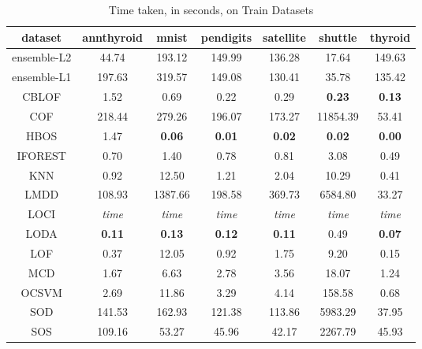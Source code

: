 \begin{table*}[!t]
\renewcommand{\arraystretch}{1.25}
\caption{Time taken, in seconds, on Train Datasets}
\label{table:results:train-time}
\centering
\begin{tabular}{|c|c|c|c|c|c|c|}
    \hline
    \textbf{dataset} & \textbf{annthyroid} & \textbf{mnist} & \textbf{pendigits} & \textbf{satellite} & \textbf{shuttle} & \textbf{thyroid} \\
    \hline
    ensemble-L2 & 44.74 & 193.12 & 149.99 & 136.28 & 17.64 & 149.63 \\
    \hline
    ensemble-L1 & 197.63 & 319.57 & 149.08 & 130.41 & 35.78 & 135.42 \\
    \hline
    CBLOF & 1.52 & 0.69 & 0.22 & 0.29 & \bfseries 0.23 & \bfseries 0.13 \\
    \hline
    COF & 218.44 & 279.26 & 196.07 & 173.27 & 11854.39 & 53.41 \\
    \hline
    HBOS & 1.47 & \bfseries 0.06 & \bfseries 0.01 & \bfseries 0.02 & \bfseries 0.02 & \bfseries 0.00 \\
    \hline
    IFOREST & 0.70 & 1.40 & 0.78 & 0.81 & 3.08 & 0.49 \\
    \hline
    KNN & 0.92 & 12.50 & 1.21 & 2.04 & 10.29 & 0.41 \\
    \hline
    LMDD & 108.93 & 1387.66 & 198.58 & 369.73 & 6584.80 & 33.27 \\
    \hline
    LOCI & \textit{time} & \textit{time} & \textit{time} & \textit{time} & \textit{time} & \textit{time} \\
    \hline
    LODA & \bfseries 0.11 & \bfseries 0.13 & \bfseries 0.12 & \bfseries 0.11 & 0.49 & \bfseries 0.07 \\
    \hline
    LOF & 0.37 & 12.05 & 0.92 & 1.75 & 9.20 & 0.15 \\
    \hline
    MCD & 1.67 & 6.63 & 2.78 & 3.56 & 18.07 & 1.24 \\
    \hline
    OCSVM & 2.69 & 11.86 & 3.29 & 4.14 & 158.58 & 0.68 \\
    \hline
    SOD & 141.53 & 162.93 & 121.38 & 113.86 & 5983.29 & 37.95 \\
    \hline
    SOS & 109.16 & 53.27 & 45.96 & 42.17 & 2267.79 & 45.93 \\
    \hline
\end{tabular}
\end{table*}


